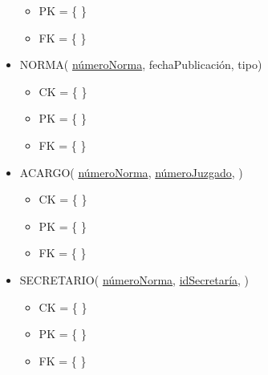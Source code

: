 \begin{itemize}
\begin{itemize}
		\item PK = \{ \}
		\item FK = \{ \}
	\end{itemize}
\item NORMA( \underline{númeroNorma}, fechaPublicación, tipo)
	\begin{itemize}
		\item CK = \{ \}
		\item PK = \{ \}
		\item FK = \{ \}
	\end{itemize}
\item ACARGO(  \underline{númeroNorma}, \underline{númeroJuzgado}, ) \\
	\begin{itemize}
		\item CK = \{ \}
		\item PK = \{ \}
		\item FK = \{ \}
	\end{itemize}
\item SECRETARIO( \underline{númeroNorma}, \underline{idSecretaría}, ) \\
	\begin{itemize}
		\item CK = \{ \}
		\item PK = \{ \}
		\item FK = \{ \}
	\end{itemize}
\end{itemize}


